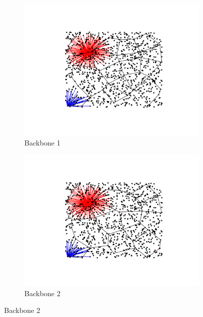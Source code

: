 \documentclass[oneside, titlepage]{scrartcl}
\begin{document}
\begin{figure}[!h]
\begin{subfigure}{0.5\textwidth}
	\centering
	\includegraphics[width=0.9\linewidth]{figures/simplegraph50.pdf}
	\caption{Backbone 1}
\end{subfigure}%
\begin{subfigure}{0.5\textwidth}
	\centering
	\includegraphics[width=0.9\linewidth]{figures/simplegraph501.pdf}
	\caption{Backbone 2}
\end{subfigure}
\end{figure}
\end{document}
